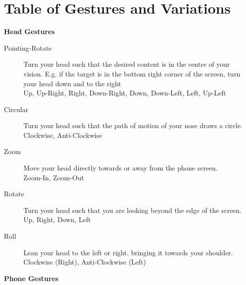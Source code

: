\appendix
\clearpage
\restoregeometry
\newpage
\section{Table of Gestures and Variations}\label{app:gestures}
\textbf{Head Gestures}
\begin{description}
    \item[Pointing-Rotate]\nl
    Turn your head such that the desired content is in the centre of your vision. E.g. if the target is in the bottom right corner of the screen, turn your head down and to the right\\
     Up, Up-Right, Right, Down-Right, Down, Down-Left, Left, Up-Left
    \item[Circular]\nl
    Turn your head such that the path of motion of your nose draws a circle.\\
     Clockwise, Anti-Clockwise
    \item[Zoom]\nl
    Move your head directly towards or away from the phone screen.\\
     Zoom-In, Zoom-Out
    \item[Rotate]\nl
    Turn your head such that you are looking beyond the edge of the screen.\\
     Up, Right, Down, Left
    \item[Roll]\nl
    Lean your head to the left or right, bringing it towards your shoulder.\\
     Clockwise (Right), Anti-Clockwise (Left)
\end{description}\nl
\textbf{Phone Gestures}
